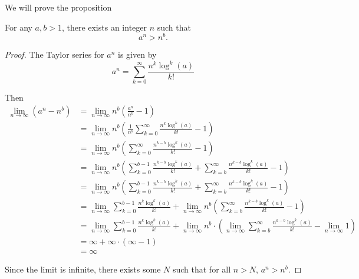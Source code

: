 We will prove the proposition

\begin{proposition}
    For any $a,b>1$, there exists an integer $n$ such that
    \[
    a^n > n^b \text{.}
    \]
\end{proposition}

\begin{proof}
    The Taylor series for $a^n$ is given by
    \[
    a^n = \sum_{k=0}^{\infty} \frac{n^k \log^k(a)}{k!}
    \]

    Then
    \begin{align*}
        \lim_{n \to \infty} (a^n - n^b) &= \lim_{n \to \infty} n^b \left( \frac{a^n}{n^b} - 1 \right )\\
            &= \lim_{n \to \infty} n^b \left( \frac{1}{n^b} \sum_{k=0}^{\infty} \frac{n^k\log^k(a)}{k!} - 1 \right)\\
            &= \lim_{n \to \infty} n^b \left(\sum_{k=0}^{\infty} \frac{n^{k-b}\log^k(a)}{k!} -1 \right)\\
            &= \lim_{n \to \infty} n^b \left( \sum_{k=0}^{b-1} \frac{n^{k-b}\log^k(a)}{k!} + \sum_{k=b}^{\infty} \frac{n^{k-b}\log^k(a)}{k!} -1 \right)\\
            &= \lim_{n \to \infty} n^b \left( \sum_{k=0}^{b-1} \frac{n^{k-b}\log^k(a)}{k!} + \sum_{k=b}^{\infty} \frac{n^{k-b}\log^k(a)}{k!} -1 \right)\\
            &= \lim_{n \to \infty} \sum_{k=0}^{b-1} \frac{n^k \log^k(a)}{k!} + \lim_{n \to \infty} n^b \left( \sum_{k=b}^{\infty} \frac{n^{k-b}\log^k(a)}{k!} - 1 \right)\\
            &= \lim_{n \to \infty} \sum_{k=0}^{b-1} \frac{n^k \log^k(a)}{k!} + \lim_{n \to \infty} n^b \cdot \left(\lim_{n \to \infty} \sum_{k=b}^{\infty} \frac{n^{k-b}\log^k(a)}{k!} - \lim_{n \to \infty} 1   \right) \\
            &= \infty + \infty \cdot (\infty - 1)\\
            &= \infty
    \end{align*}

    Since the limit is infinite, there exists some $N$ such that for all $n > N$, $a^n > n^b$.

\end{proof}